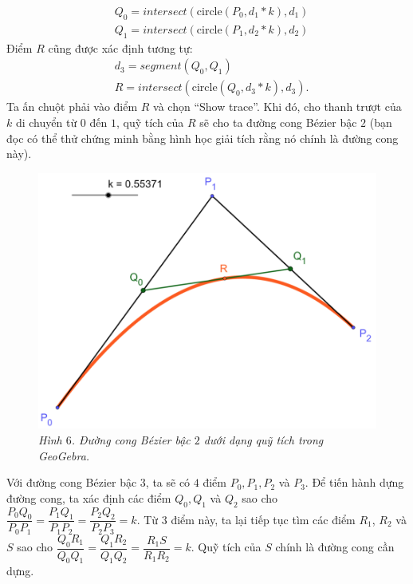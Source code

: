 \begin{multicols}{2}
\begin{align*}
		&Q_0=intersect\left(\text{circle} (P_0,d_1*k),d_1\right)\\
		&Q_1=intersect\left(\text{circle} (P_1,d_2*k),d_2\right)
	\end{align*}
	Điểm $R$ cũng được xác định tương tự:
	\begin{align*}
		&d_3=segment(Q_0,Q_1 )\\
		&R=intersect\left(\text{circle} (Q_0,d_3*k),d_3\right).
	\end{align*}
	Ta ấn chuột phải vào điểm $R$ và chọn ``Show trace''. Khi đó, cho thanh trượt của $k$ di chuyển từ $0$ đến $1$, quỹ tích của $R$ sẽ cho ta đường cong Bézier bậc $2$ (bạn đọc có thể thử chứng minh bằng hình học giải tích rằng nó chính là đường cong này).
	\begin{figure}[H]
		\vspace*{-5pt}
		\centering
		\captionsetup{labelformat= empty, justification=centering}
		\includegraphics[width= 0.8\linewidth]{10}
		\caption{\small\textit{\color{toanhocdoisong}Hình $6$. Đường cong Bézier bậc $2$ dưới dạng quỹ tích trong GeoGebra.}}
		\vspace*{-10pt}
	\end{figure}
	Với đường cong Bézier bậc $3$, ta sẽ có $4$ điểm $P_0,P_1,P_2$ và $P_3$. Để tiến hành dựng đường cong, ta xác định các điểm $Q_0,Q_1$ và $Q_2$ sao cho $\dfrac{P_0 Q_0}{P_0 P_1}= \dfrac{P_1 Q_1}{P_1 P_2}= \dfrac{P_2 Q_2}{P_2 P_3} =k$. Từ $3$ điểm này, ta lại tiếp tục tìm các điểm $R_1$, $R_2$ và $S$ sao cho $\dfrac{Q_0 R_1}{Q_0 Q_1} = \dfrac{Q_1 R_2}{Q_1 Q_2}= \dfrac{R_1 S}{R_1 R_2}=k$. Quỹ tích của $S$ chính là đường cong cần dựng.
	\begin{figure}[H]
		\vspace*{-5pt}
		\centering
		\captionsetup{labelformat= empty, justification=centering}

\end{figure}
\end{multicols}
